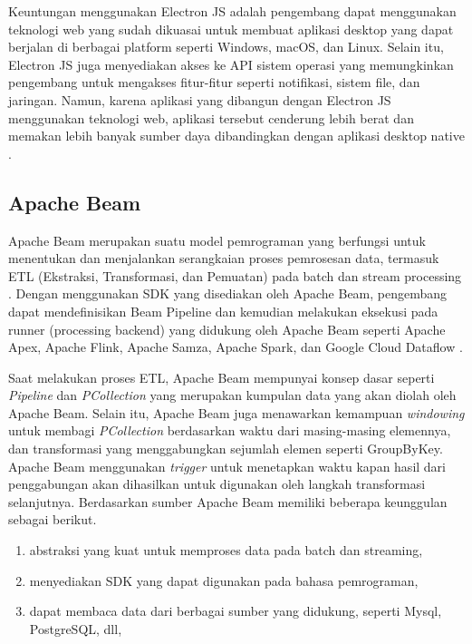 Keuntungan menggunakan Electron JS adalah pengembang dapat menggunakan teknologi web yang sudah dikuasai untuk membuat aplikasi desktop yang dapat berjalan di berbagai platform seperti Windows, macOS, dan Linux. Selain itu, Electron JS juga menyediakan akses ke API sistem operasi yang memungkinkan pengembang untuk mengakses fitur-fitur seperti notifikasi, sistem file, dan jaringan. Namun, karena aplikasi yang dibangun dengan Electron JS menggunakan teknologi web, aplikasi tersebut cenderung lebih berat dan memakan lebih banyak sumber daya dibandingkan dengan aplikasi desktop native \parencite{electonjs-alain}.

\subsection{Apache Beam}
Apache Beam merupakan suatu model pemrograman yang berfungsi untuk menentukan dan menjalankan serangkaian proses pemrosesan data, termasuk ETL (Ekstraksi, Transformasi, dan Pemuatan) pada batch dan stream processing \parencite{apacheoverview}. Dengan menggunakan SDK yang disediakan oleh Apache Beam, pengembang dapat mendefinisikan Beam Pipeline dan kemudian melakukan eksekusi pada runner (processing backend) yang didukung oleh Apache Beam seperti Apache Apex, Apache Flink, Apache Samza, Apache Spark, dan Google Cloud Dataflow \parencite{apacheoverview}.

Saat melakukan proses ETL, Apache Beam mempunyai konsep dasar seperti \emph{Pipeline} dan \emph{PCollection} yang merupakan kumpulan data yang akan diolah oleh Apache Beam. Selain itu, Apache Beam juga menawarkan kemampuan \emph{windowing} untuk membagi \emph{PCollection} berdasarkan waktu dari masing-masing elemennya, dan transformasi yang menggabungkan sejumlah elemen seperti GroupByKey. Apache Beam menggunakan \emph{trigger} untuk menetapkan waktu kapan hasil dari penggabungan akan dihasilkan untuk digunakan oleh langkah transformasi selanjutnya. Berdasarkan sumber \textcite{apache-advantage} Apache Beam memiliki beberapa keunggulan sebagai berikut.
\begin{enumerate}
  \item abstraksi yang kuat untuk memproses data pada batch dan streaming,
  \item menyediakan SDK yang dapat digunakan pada bahasa pemrograman,
  \item dapat membaca data dari berbagai sumber yang didukung, seperti Mysql, PostgreSQL, dll,
\end{enumerate}




